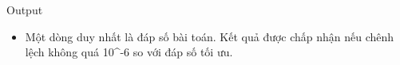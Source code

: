 Output  
\begin{itemize}
	\item     Một dòng duy nhất là đáp số bài toán. Kết quả được chấp nhận nếu chênh lệch không quá 10^-6 so với đáp số tối ưu.   
\end{itemize}